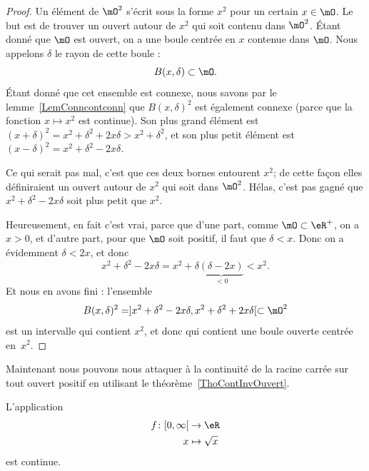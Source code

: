 \begin{proof}
	Un élément de \( \mO^2\) s'écrit sous la forme \( x^2\) pour un certain \( x\in\mO\). Le but est de trouver un ouvert autour de \( x^2\) qui soit contenu dans \( \mO^2\). Étant donné que \( \mO\) est ouvert, on a une boule centrée en \( x\) contenue dans \( \mO\). Nous appelons \( \delta\) le rayon de cette boule :
	\[
		B(x,\delta)\subset\mO.
	\]
	Étant donné que cet ensemble est connexe, nous savons par le lemme~\ref{LemConncontconn} que \( B(x,\delta)^2\) est également connexe (parce que la fonction \( x\mapsto x^2\) est continue). Son plus grand élément est \( (x+\delta)^2=x^2+\delta^2+2x\delta>x^2+\delta^2\), et son plus petit élément est \( (x-\delta)^2=x^2+\delta^2-2x\delta\).

	Ce qui serait pas mal, c'est que ces deux bornes entourent \( x^2\); de cette façon elles définiraient un ouvert autour de \( x^2\) qui soit dans \( \mO^2\). Hélas, c'est pas gagné que \( x^2+\delta^2-2x\delta\) soit plus petit que \( x^2\).

	Heureusement, en fait c'est vrai, parce que d'une part, comme \( \mO\subset\eR^+\), on a \( x>0\), et d'autre part, pour que \( \mO\) soit positif, il faut que \( \delta<x\). Donc on a évidemment \( \delta<2x\), et donc
	\[
		x^2+\delta^2-2x\delta=x^2+\delta\underbrace{(\delta-2x)}_{<0}<x^2.
	\]
	Et nous en avons fini : l'ensemble
	\[
		B(x,\delta)^2=]x^2+\delta^2-2x\delta,x^2+\delta^2+2x\delta[\subset\mO^2
	\]
	est un intervalle qui contient \( x^2\), et donc qui contient une boule ouverte centrée en~\( x^2\).
\end{proof}

Maintenant nous pouvons nous attaquer à la continuité de la racine carrée sur tout ouvert positif en utilisant le théorème~\ref{ThoContInvOuvert}.

\begin{proposition}		\label{PROPooLMIMooKGDHUw}
	L'application
	\begin{equation}
		\begin{aligned}
			f\colon \mathopen[ 0,\infty\mathclose[ & \to \eR            \\
			x                                      & \mapsto \sqrt{ x }
		\end{aligned}
	\end{equation}
	est continue.
\end{proposition}

